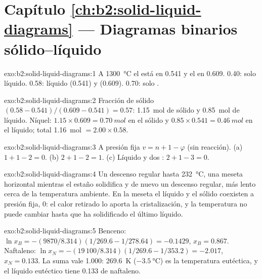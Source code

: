 \section*{Capítulo \ref{ch:b2:solid-liquid-diagrams} --- Diagramas binarios sólido--líquido}

\begin{solution}{exo:b2:solid-liquid-diagrams:1}
A \qty{1300}{\degreeCelsius} el  está en 0.541 y el  en 0.609.
0.40: solo líquido. 0.58: líquido (0.541) y  (0.609). 0.70:
solo .
\end{solution}

\begin{solution}{exo:b2:solid-liquid-diagrams:2}
Fracción de sólido $(0.58 - 0.541)/(0.609 - 0.541) = 0.57$: \qty{1.15}{mol} de sólido y
\qty{0.85}{mol} de líquido. Níquel: $1.15 \times 0.609 = \qty{0.70}{mol}$ en el
sólido y $0.85 \times 0.541 = \qty{0.46}{mol}$ en el líquido; total \qty{1.16}{mol}
$= 2.00 \times 0.58$.
\end{solution}

\begin{solution}{exo:b2:solid-liquid-diagrams:3}
A presión fija $v = n + 1 - \varphi$ (sin reacción). (a) $1 + 1 - 2 = 0$.
(b) $2 + 1 - 2 = 1$. (c) Líquido y dos : $2 + 1 - 3 = 0$.
\end{solution}

\begin{solution}{exo:b2:solid-liquid-diagrams:4}
Un descenso regular hasta \qty{232}{\degreeCelsius}, una meseta horizontal mientras el estaño
solidifica y de nuevo un descenso regular, más lento cerca de la temperatura ambiente. En la
meseta el líquido y el sólido coexisten a presión fija,  0: el calor
retirado lo aporta la cristalización, y la temperatura no puede cambiar
hasta que ha solidificado el último líquido.
\end{solution}

\begin{solution}{exo:b2:solid-liquid-diagrams:5}
Benceno: $\ln x_B = -(9870/8.314)(1/269.6 - 1/278.64) = -0.1429$, $x_B =
0.867$. Naftaleno: $\ln x_N = -(19\,100/8.314)(1/269.6 - 1/353.2) = -2.017$,
$x_N = 0.133$. La suma vale 1.000: \qty{269.6}{K} ($\qty{-3.5}{\degreeCelsius}$) es
la temperatura eutéctica, y el líquido eutéctico tiene 0.133 de naftaleno.
\end{solution}

